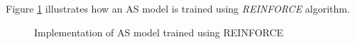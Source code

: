 Figure \ref{fig:reinforce_flowchart} illustrates how an AS model is trained using \textit{REINFORCE} algorithm. 

\begin{figure}[H]
	\centering
	\caption{Implementation of AS model trained using REINFORCE}
	\label{fig:reinforce_flowchart}
\end{figure}

